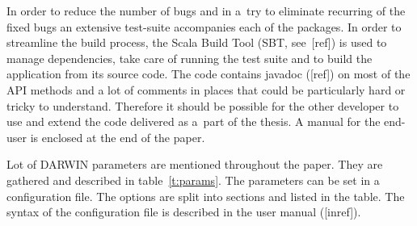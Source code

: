 In order to reduce the number of bugs and in a~try to eliminate recurring of
the fixed bugs an extensive test-suite accompanies each of the packages. In
order to streamline the build process, the Scala Build Tool (SBT, see~[ref])
is used to manage dependencies, take care of running the test suite and to
build the application from its source code. The code contains javadoc ([ref])
on most of the API methods and a lot of comments in places that could be
particularly hard or tricky to understand. Therefore it should be possible for
the other developer to use and extend the code delivered as a~part of the
thesis. A manual for the end-user is enclosed at the end of the paper.

Lot of DARWIN parameters are mentioned throughout the paper. They are gathered
and described in table~\ref{t:params}. The parameters can be set in a
configuration file. The options are split into sections and listed in the
table. The syntax of the configuration file is described in the user manual
([inref]).

